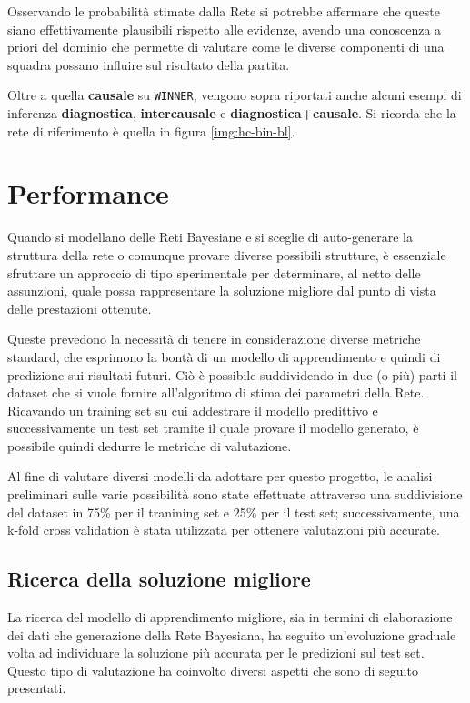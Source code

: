\documentclass[hidelinks, 12pt]{article}
\begin{document}
Osservando le probabilità stimate dalla Rete si potrebbe affermare che queste siano effettivamente plausibili rispetto alle evidenze, avendo una conoscenza a priori del dominio che permette di valutare come le diverse componenti di una squadra possano influire sul risultato della partita.

Oltre a quella \textbf{causale} su \texttt{WINNER}, vengono sopra riportati anche alcuni esempi di inferenza \textbf{diagnostica}, \textbf{intercausale} e \textbf{diagnostica+causale}. Si ricorda che la rete di riferimento è quella in figura \ref{img:hc-bin-bl}.



\clearpage



\section{Performance}

Quando si modellano delle Reti Bayesiane e si sceglie di auto-generare la struttura della rete o comunque provare diverse possibili strutture, è essenziale sfruttare un approccio di tipo sperimentale per determinare, al netto delle assunzioni, quale possa rappresentare la soluzione migliore dal punto di vista delle prestazioni ottenute.

Queste prevedono la necessità di tenere in considerazione diverse metriche standard, che esprimono la bontà di un modello di apprendimento e quindi di predizione sui risultati futuri. Ciò è possibile suddividendo in due (o più) parti il dataset che si vuole fornire all'algoritmo di stima dei parametri della Rete. Ricavando un training set su cui addestrare il modello predittivo e successivamente un test set tramite il quale provare il modello generato, è possibile quindi dedurre le metriche di valutazione.

Al fine di valutare diversi modelli da adottare per questo progetto, le analisi preliminari sulle varie possibilità sono state effettuate attraverso una suddivisione del dataset in 75\% per il tranining set e 25\% per il test set; successivamente, una k-fold cross validation è stata utilizzata per ottenere valutazioni più accurate.



\subsection{Ricerca della soluzione migliore}

La ricerca del modello di apprendimento migliore, sia in termini di elaborazione dei dati che generazione della Rete Bayesiana, ha seguito un'evoluzione graduale volta ad individuare la soluzione più accurata per le predizioni sul test set. Questo tipo di valutazione ha coinvolto diversi aspetti che sono di seguito presentati.
\end{document}
